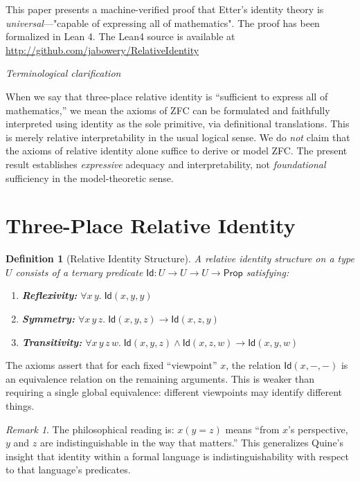 \documentclass{ws-rv9x6}
\newtheorem{definition}[theorem]{Definition}
\theoremstyle{remark}
\newtheorem{remark}[theorem]{Remark}
\newcommand{\Id}{\mathsf{Id}}
\begin{document}
This paper presents a machine-verified proof that Etter's identity theory is \emph{universal}---"capable of expressing all of mathematics". The proof has been formalized in Lean 4.  The Lean4 source is available at \url{http://github.com/jabowery/RelativeIdentity}

\emph{Terminological clarification}

When we say that three-place relative identity is “sufficient to express all of mathematics,” we mean the axioms of ZFC can be formulated and faithfully interpreted using identity as the sole primitive, via definitional translations. This is merely relative interpretability in the usual logical sense. We do \emph{not} claim that the axioms of relative identity alone suffice to derive or model ZFC. The present result establishes \emph{expressive} adequacy and interpretability, not \emph{foundational} sufficiency in the model-theoretic sense.

\section{Three-Place Relative Identity}

\begin{definition}[Relative Identity Structure]
A \emph{relative identity structure} on a type $U$ consists of a ternary predicate $\Id : U \to U \to U \to \mathsf{Prop}$ satisfying:
\begin{enumerate}[label=(\roman*)]
    \item \textbf{Reflexivity:} $\forall x\, y.\; \Id(x, y, y)$
    \item \textbf{Symmetry:} $\forall x\, y\, z.\; \Id(x, y, z) \to \Id(x, z, y)$
    \item \textbf{Transitivity:} $\forall x\, y\, z\, w.\; \Id(x, y, z) \land \Id(x, z, w) \to \Id(x, y, w)$
\end{enumerate}
\end{definition}

The axioms assert that for each fixed ``viewpoint'' $x$, the relation $\Id(x, -, -)$ is an equivalence relation on the remaining arguments. This is weaker than requiring a single global equivalence: different viewpoints may identify different things.

\begin{remark}
The philosophical reading is: $x(y = z)$ means ``from $x$'s perspective, $y$ and $z$ are indistinguishable in the way that matters.'' This generalizes Quine's insight that identity within a formal language is indistinguishability with respect to that language's predicates.
\end{remark}
\end{document}
